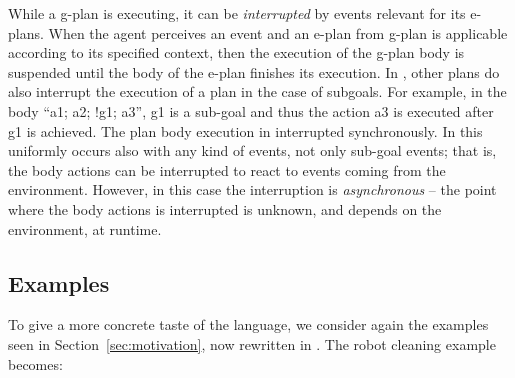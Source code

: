 %
%
%


While a g-plan is executing, it can be \emph{interrupted} by events
relevant for its e-plans. When the agent perceives an event and an
e-plan from g-plan is applicable according to its specified context,
then the execution of the g-plan body is suspended until the body of
the e-plan finishes its execution.
%
In {\asl}, other plans do also interrupt the execution of a plan in
the case of subgoals. For example, in the body ``\textsf{a1; a2; !g1;
  a3}'', \textsf{g1} is a sub-goal and thus the action \textsf{a3} is
executed after \textsf{g1} is achieved. The plan body
execution in interrupted synchronously.
%
In {\aser} this uniformly occurs also with any kind of events, not
only sub-goal events; that is, the body actions can be interrupted to
react to events coming from the environment. However, in this case the
interruption is \emph{asynchronous} -- the point where the body
actions is interrupted is unknown, and depends on the environment, at
runtime.
%


%
\subsection{Examples}
To give a more concrete taste of the language, we consider again the
examples seen in Section~\ref{sec:motivation}, now rewritten in
{\aser}.
%
The robot cleaning example becomes:

